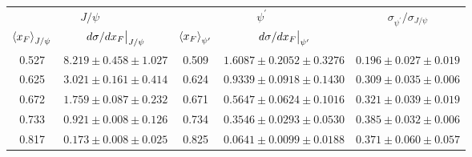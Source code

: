 \begin{tabular}{cc|cc|c}
\hline
\multicolumn{2}{c|}{$J/\psi$}                               & \multicolumn{2}{c|}{$\psi^{\prime}$}                                                    & \multirow{2}{*}{$\sigma_{\psi^\prime}/\sigma_{J/\psi}$} \\ \cline{1-4}
$\expval{x_F}_{J/\psi}$    & $\eval{d\sigma/dx_F}_{J/\psi}$ & $\expval{x_F}_{\psi^\prime}$ & $\eval{d\sigma/dx_F}_{\psi^\prime}$ &                                                         \\ \hline
\multicolumn{1}{c|}{0.527} & $8.219\pm0.458\pm1.027$        & \multicolumn{1}{c|}{0.509}                        & $1.6087\pm0.2052\pm0.3276$          & $0.196\pm0.027\pm0.019$                                 \\
\multicolumn{1}{c|}{0.625} & $3.021\pm0.161\pm0.414$        & \multicolumn{1}{c|}{0.624}                        & $0.9339\pm0.0918\pm0.1430$          & $0.309\pm0.035\pm0.006$                                 \\
\multicolumn{1}{c|}{0.672} & $1.759\pm0.087\pm0.232$        & \multicolumn{1}{c|}{0.671}                        & $0.5647\pm0.0624\pm0.1016$          & $0.321\pm0.039\pm0.019$                                 \\
\multicolumn{1}{c|}{0.733} & $0.921\pm0.008\pm0.126$        & \multicolumn{1}{c|}{0.734}                        & $0.3546\pm0.0293\pm0.0530$          & $0.385\pm0.032\pm0.006$                                 \\
\multicolumn{1}{c|}{0.817} & $0.173\pm0.008\pm0.025$        & \multicolumn{1}{c|}{0.825}                        & $0.0641\pm0.0099\pm0.0188$          & $0.371\pm0.060\pm0.057$                                 \\ \hline
\end{tabular}
